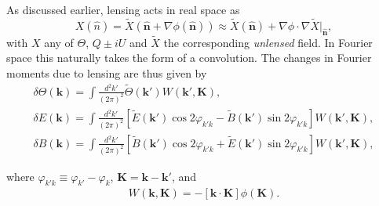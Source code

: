 \documentclass[11pt]{article} %
\begin{document}
As discussed earlier, lensing acts in real space as 
\begin{equation*}
    X(\hat n) = \tilde X(\hat {\mathbf n} + \nabla \phi(\hat{\mathbf n})) \approx \tilde X(\hat{\mathbf n}) + \nabla \phi \cdot \nabla \tilde X |_{\hat{\mathbf{n}}},
\end{equation*}
with $X$ any of $\Theta$, $Q \pm iU$ and $\tilde X$ the corresponding \textit{unlensed} field. In Fourier space this naturally takes the form of a convolution. The changes in Fourier moments due to lensing are thus given by \cite{Hu_2002}
\begin{gather*}
    \delta \Theta(\mathbf{k}) = \int \frac{d^2 k'}{(2\pi)^2} \tilde{\Theta}(\mathbf{k'}) W(\mathbf{k'}, \mathbf{K}), \\[8pt]
    \delta E(\mathbf{k}) = \int \frac{d^2 k'}{(2\pi)^2} 
    \left[ \tilde{E}(\mathbf{k'}) \cos 2\varphi_{k'k} - \tilde{B}(\mathbf{k'}) \sin 2\varphi_{k'k} \right] W(\mathbf{k'}, \mathbf{K}), \\[8pt]
    \delta B(\mathbf{k}) = \int \frac{d^2 k'}{(2\pi)^2} 
    \left[ \tilde{B}(\mathbf{k'}) \cos 2\varphi_{k'k} + \tilde{E}(\mathbf{k'}) \sin 2\varphi_{k'k} \right] W(\mathbf{k'}, \mathbf{K}),
\end{gather*}

\noindent where \( \varphi_{k'k} \equiv \varphi_{k'} - \varphi_k \), \( \mathbf{K} = \mathbf{k} - \mathbf{k'} \), and
\begin{gather*}
    W(\mathbf{k}, \mathbf{K}) = -[\mathbf{k} \cdot \mathbf{K}] \phi(\mathbf{K}).
\end{gather*}
\end{document}
